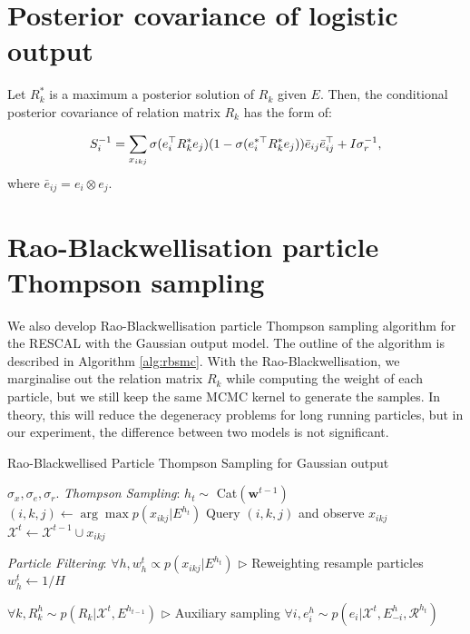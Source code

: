 \section*{Posterior covariance of logistic output}
Let $R_k^*$ is a maximum a posterior solution of $R_k$ given $E$. Then, the conditional posterior covariance of relation matrix $R_k$ has the form of:

\begin{align}
S_i^{-1} = \sum_{x_{ikj}} \sigma(e_{i}^{\top} R_k^* e_{j}) (1 - \sigma(e_{i}^{*\top} R_k^* e_{j})) 
\bar{e}_{ij}\bar{e}_{ij}^\top + I\sigma_r^{-1}, \notag
\end{align}
where $\bar{e}_{ij} = e_i \otimes e_j$.

\section*{Rao-Blackwellisation particle Thompson sampling}
We also develop Rao-Blackwellisation particle Thompson sampling algorithm for the RESCAL with the Gaussian output model. The outline of the algorithm is described in Algorithm \ref{alg:rbsmc}. With the Rao-Blackwellisation, we marginalise out the relation matrix $R_k$ while computing the weight of each particle, but we still keep the same MCMC kernel to generate the samples. In theory, this will reduce the degeneracy problems for long running particles, but in our experiment, the difference between two models is not significant.
\begin{algorithm}[t!]
   \caption{Rao-Blackwellised Particle Thompson Sampling for Gaussian output}
   \label{alg:rbsmc}
\begin{algorithmic}
    $\sigma_x, \sigma_e, \sigma_r$.
   \STATE \textit{Thompson Sampling}:
   \STATE $h_t \sim $ Cat$(\mathbf{w}^{t-1})$
   \STATE $(i,k,j) \leftarrow \arg\max p(x_{ikj}| E^{h_t})$   %
   \STATE Query $(i,k,j)$ and observe $x_{ikj}$
   \STATE $\mathcal{X}^{t} \leftarrow \mathcal{X}^{t-1} \cup x_{ikj}$

   \STATE \textit{Particle Filtering}:
   \STATE $\forall h, w_h^{t} \propto p(x_{ikj} | E^{h_t})$   \hfill $\triangleright$ Reweighting%
   \STATE resample particles
   \STATE $w_h^{t} \leftarrow 1/H$
   \ENDIF

   \STATE $\forall k, R_k^{h} \sim p(R_k | \mathcal{X}^{t}, E^{h_{t-1}})$   \hfill $\triangleright$ Auxiliary sampling%
   \STATE $\forall i, e^{h}_i \sim p(e_i | \mathcal{X}^{t}, E^{h}_{-i}, \mathcal{R}^{h_t})$ %
   \ENDFOR

   \ENDFOR
\end{algorithmic}
\end{algorithm}
